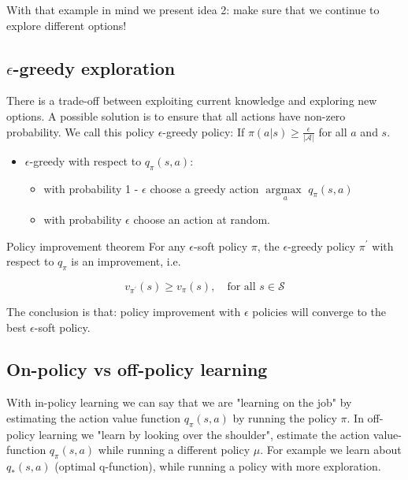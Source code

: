 With that example in mind we present idea 2: make sure that we continue to explore different options!

\subsection{$\epsilon$-greedy exploration}
There is a trade-off between exploiting current knowledge and exploring new options. A possible solution is to ensure that all actions have non-zero probability. We call this policy $\epsilon$-greedy policy: If $\pi (a|s) \ge \frac{\epsilon} {|\mathcal{A}|} $ for all $a$ and $s$. 

\begin{itemize}
	\item $\epsilon$-greedy with respect to $q_\pi(s,a)$: 
	\begin{itemize}
		\item with probability 1 - $\epsilon$ choose a greedy action $\underset{a}{\arg \text{max }} q_\pi(s,a)$
		\item with probability $\epsilon$ choose an action at random.
	\end{itemize}
\end{itemize}

\begin{wbox}{Policy improvement theorem}
For any $\epsilon$-soft policy $\pi$, the $\epsilon$-greedy policy $\pi^{\prime}$ with respect to $q_\pi$ is an improvement, i.e.

	\begin{equation}
		v_{\pi^{\prime}}(s) \ge v_\pi(s), \quad \text{for all } s \in \mathcal{S}
	\end{equation}
\end{wbox}

The conclusion is that: policy improvement with $\epsilon$ policies will converge to the best $\epsilon$-soft policy. 

\subsection{On-policy vs off-policy learning}
With in-policy learning we can say that we are "learning on the job" by estimating the action value function $q_\pi(s,a)$ by running the policy $\pi$. In off-policy learning we "learn by looking over the shoulder", estimate the action value-function $q_\pi(s,a)$ while running a different policy $\mu$. For example we learn about $q_*(s,a)$ (optimal q-function), while running a policy with more exploration.


